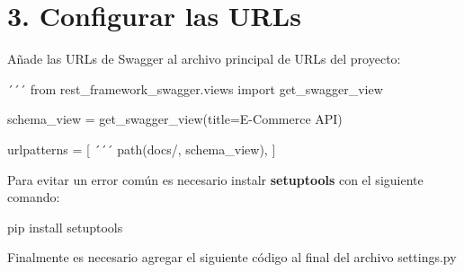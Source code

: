 \documentclass[
  a4paper,
  DIV=11,
  numbers=noendperiod,
  onepage,
  openany]{scrreprt}
\newenvironment{Shaded}{\begin{snugshade}}{\end{snugshade}}
\newcommand{\ExtensionTok}[1]{\textcolor[rgb]{0.00,0.23,0.31}{#1}}
\newcommand{\ImportTok}[1]{\textcolor[rgb]{0.00,0.46,0.62}{#1}}
\newcommand{\NormalTok}[1]{\textcolor[rgb]{0.00,0.23,0.31}{#1}}
\newcommand{\OperatorTok}[1]{\textcolor[rgb]{0.37,0.37,0.37}{#1}}
\newcommand{\StringTok}[1]{\textcolor[rgb]{0.13,0.47,0.30}{#1}}
\begin{document}
\section{3. Configurar las URLs}\label{configurar-las-urls}

Añade las URLs de Swagger al archivo principal de URLs del proyecto:

\begin{Shaded}
\begin{Highlighting}[]
\NormalTok{´´´}
\ImportTok{from}\NormalTok{ rest\_framework\_swagger.views }\ImportTok{import}\NormalTok{ get\_swagger\_view}

\NormalTok{schema\_view }\OperatorTok{=}\NormalTok{ get\_swagger\_view(title}\OperatorTok{=}\StringTok{\textquotesingle{}E{-}Commerce API\textquotesingle{}}\NormalTok{)}

\NormalTok{urlpatterns }\OperatorTok{=}\NormalTok{ [}
\NormalTok{    ´´´}
\NormalTok{    path(}\StringTok{\textquotesingle{}docs/\textquotesingle{}}\NormalTok{, schema\_view),}
\NormalTok{]}
\end{Highlighting}
\end{Shaded}

\begin{tcolorbox}[enhanced jigsaw, toprule=.15mm, title=\textcolor{quarto-callout-tip-color}{\faLightbulb}\hspace{0.5em}{Tip}, opacitybacktitle=0.6, colbacktitle=quarto-callout-tip-color!10!white, toptitle=1mm, breakable, left=2mm, coltitle=black, colback=white, bottomrule=.15mm, colframe=quarto-callout-tip-color-frame, bottomtitle=1mm, arc=.35mm, titlerule=0mm, opacityback=0, rightrule=.15mm, leftrule=.75mm]

Para evitar un error común es necesario instalr \textbf{setuptools} con
el siguiente comando:

\begin{Shaded}
\begin{Highlighting}[]
\ExtensionTok{pip}\NormalTok{ install setuptools}
\end{Highlighting}
\end{Shaded}

\end{tcolorbox}

Finalmente es necesario agregar el siguiente código al final del archivo
settings.py
\end{document}
